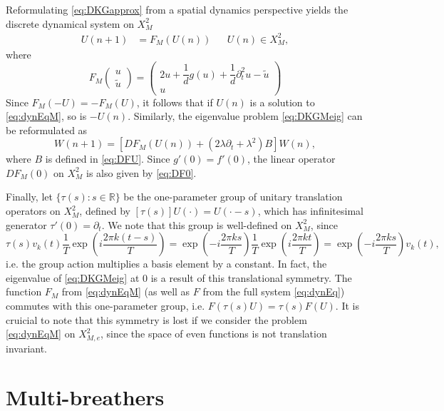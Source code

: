 \documentclass[12pt,reqno]{amsart}
\def\R{{\mathbb R}}
\theoremstyle{definition}
\begin{document}
Reformulating \cref{eq:DKGapprox} from a spatial dynamics perspective yields the discrete dynamical system on $X_M^2$
\begin{align}\label{eq:dynEqM}
U(n+1) &= F_M(U(n)) && U(n) \in X_M^2,
\end{align}
where
\begin{equation}\label{eq:FM}
F_M\begin{pmatrix}u \\ \tilde{u} \end{pmatrix} = 
\begin{pmatrix}2u  + \dfrac{1}{d}g(u) + \dfrac{1}{d} \partial_t^2 u - \tilde{u} \\
u
\end{pmatrix}
\end{equation}
Since $F_M(-U) = -F_M(U)$, it follows that if $U(n)$ is a solution to \cref{eq:dynEqM}, so is $-U(n)$. Similarly, the eigenvalue problem \cref{eq:DKGMeig} can be reformulated as
\begin{equation}\label{eq:dynEVPM}
W(n+1) = \left[ DF_M(U(n)) + (2 \lambda \partial_t + \lambda^2) B \right] W(n),
\end{equation}
where $B$ is defined in \cref{eq:DFU}. Since $g'(0) = f'(0)$, the linear operator $DF_M(0)$ on $X_M^2$ is also given by \cref{eq:DF0}. 

Finally, let $\{\tau(s) : s \in \R\}$ be the one-parameter group of unitary translation operators on $X_M^2$, defined by $[\tau(s)]U(\cdot) = U(\cdot - s)$, which has infinitesimal generator $\tau'(0) = \partial_t$. We note that this group is well-defined on $X_M^2$, since 
\[
\tau(s) v_k(t) 
\frac{1}{T} \exp\left( i \frac{2 \pi k (t-s)}{T}\right) 
= \exp\left( -i \frac{2 \pi k s}{T} \right) \frac{1}{T} \exp\left( i \frac{2 \pi k t}{T}\right) 
= \exp\left( -i \frac{2 \pi k s}{T} \right) v_k(t),
\]
i.e. the group action multiplies a basis element by a constant. In fact, the eigenvalue of \cref{eq:DKGMeig} at 0 is a result of this translational symmetry. The function $F_M$ from \cref{eq:dynEqM} (as well as $F$ from the full system \cref{eq:dynEq}) commutes with this one-parameter group, i.e. $F(\tau(s) U) = \tau(s) F(U)$. It is cruicial to note that this symmetry is lost if we consider the problem \cref{eq:dynEqM} on $X_{M,e}^2$, since the space of even functions is not translation invariant. 

\section{Multi-breathers}
\end{document}
